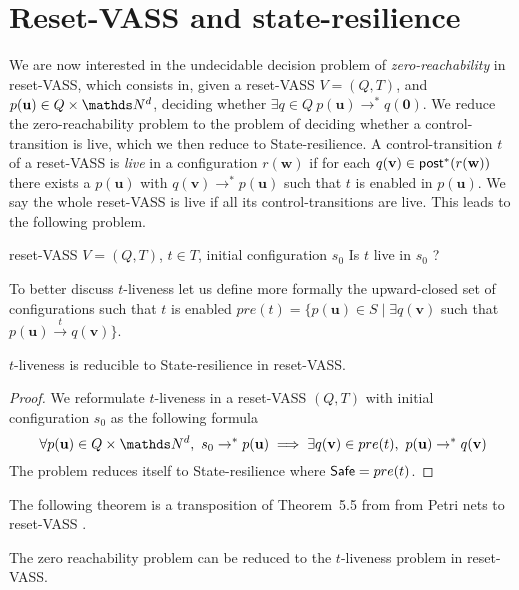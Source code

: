 

\section{Reset-VASS and state-resilience}\label{appendix}

We are now interested in the 
 undecidable \cite{araki1976PN} decision problem of {\em zero-reachability} in reset-VASS, which consists in, given a
reset-VASS $V=(Q,T)$, and $p(\textbf{u}) \in Q \times \N^d$,
deciding whether $\exists q \in Q ~ p(\textbf{u}) \to^* q(\textbf{0})$.
%
We reduce the zero-reachability problem to the problem of deciding whether a control-transition is live,
which we then reduce to {\sc State-resilience}.
A control-transition $t$ of a reset-VASS is {\em live} in a configuration $r(\textbf{w})$ if for each $q(\textbf{v}) \in \textsf{post}^*(r(\textbf{w}))$ there exists a 
 $p(\textbf{u})$ with $q(\textbf{v}) \to^* p(\textbf{u})$ such that $t$ is enabled in $p(\textbf{u})$. We say the whole reset-VASS is live if all its control-transitions are
live. This leads to the following problem.

{reset-VASS $V=(Q,T)$, $t \in T$, initial configuration $s_0$}
{Is $t$ live in $s_0$ ? \\}


To better discuss $t$-liveness let us define more formally the upward-closed set of configurations such that $t$ is enabled
$pre(t)=\{ p(\textbf{u}) \in S \mid \exists q(\textbf{v})$ such that $ p(\textbf{u}) \xrightarrow{t} q(\textbf{v}) \}$.



\begin{proposition}\label{reductions}
{\sc $t$-liveness} is reducible to {\sc State-resilience} in reset-VASS.
\end{proposition}


\begin{proof}
We reformulate $t$-liveness 
in a 
reset-VASS $(Q,T)$ 
with initial configuration $s_0$
as the following formula
\[ ~ \forall p(\textbf{u}) \in Q \times \N^d, 
~ s_0 \rightarrow^* p(\textbf{u}) \implies \exists q(\textbf{v}) \in pre(t), ~ p(\textbf{u}) \rightarrow^{*} q(\textbf{v})\]  
The problem reduces itself to {\sc State-resilience}
where $\textsf{Safe} = pre(t)$.
\end{proof}


The following theorem is a transposition of Theorem~5.5 from \cite{peterson1981petri} from Petri nets to reset-VASS%
.
\begin{proposition}\label{liveness reset}
The  zero reachability problem can be reduced to the $t$-liveness problem in reset-VASS.
\end{proposition}

